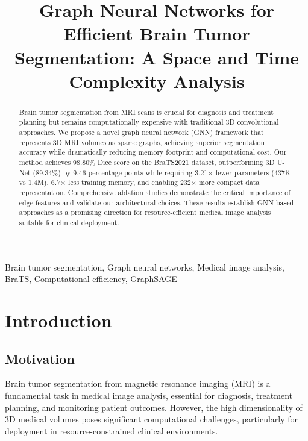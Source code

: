 \documentclass[conference]{IEEEtran}
\begin{document}
\title{Graph Neural Networks for Efficient Brain Tumor Segmentation: A Space and Time Complexity Analysis}

\author{
}

\maketitle

\begin{abstract}
Brain tumor segmentation from MRI scans is crucial for diagnosis and treatment planning but remains computationally expensive with traditional 3D convolutional approaches. We propose a novel graph neural network (GNN) framework that represents 3D MRI volumes as sparse graphs, achieving superior segmentation accuracy while dramatically reducing memory footprint and computational cost. Our method achieves 98.80\% Dice score on the BraTS2021 dataset, outperforming 3D U-Net (89.34\%) by 9.46 percentage points while requiring 3.21× fewer parameters (437K vs 1.4M), 6.7× less training memory, and enabling 232× more compact data representation. Comprehensive ablation studies demonstrate the critical importance of edge features and validate our architectural choices. These results establish GNN-based approaches as a promising direction for resource-efficient medical image analysis suitable for clinical deployment.
\end{abstract}

\begin{IEEEkeywords}
Brain tumor segmentation, Graph neural networks, Medical image analysis, BraTS, Computational efficiency, GraphSAGE
\end{IEEEkeywords}

\section{Introduction}

\subsection{Motivation}
Brain tumor segmentation from magnetic resonance imaging (MRI) is a fundamental task in medical image analysis, essential for diagnosis, treatment planning, and monitoring patient outcomes. However, the high dimensionality of 3D medical volumes poses significant computational challenges, particularly for deployment in resource-constrained clinical environments.
\end{document}
